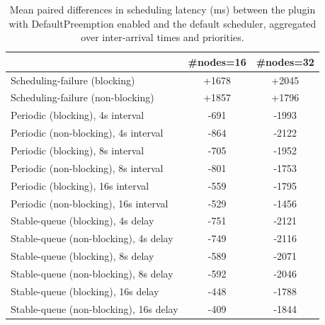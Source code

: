 \begin{table}[t]
\tiny
\setlength{\tabcolsep}{1.2pt}
\renewcommand{\arraystretch}{1.12}
\centering
\caption{Mean paired differences in scheduling latency (ms) between the plugin with DefaultPreemption enabled and the default scheduler, aggregated over inter-arrival times and priorities.}
\label{tab:latency-defpreempt1-std0-agg-arrival-prio}
\begin{tabular}{l c c}
\toprule
 & \#nodes=16 & \#nodes=32 \\
\midrule
Scheduling-failure (blocking) & +1678 & +2045 \\
Scheduling-failure (non-blocking) & +1857 & +1796 \\
Periodic (blocking), 4s interval & -691 & -1993 \\
Periodic (non-blocking), 4s interval & -864 & -2122 \\
Periodic (blocking), 8s interval & -705 & -1952 \\
Periodic (non-blocking), 8s interval & -801 & -1753 \\
Periodic (blocking), 16s interval & -559 & -1795 \\
Periodic (non-blocking), 16s interval & -529 & -1456 \\
Stable-queue (blocking), 4s delay & -751 & -2121 \\
Stable-queue (non-blocking), 4s delay & -749 & -2116 \\
Stable-queue (blocking), 8s delay & -589 & -2071 \\
Stable-queue (non-blocking), 8s delay & -592 & -2046 \\
Stable-queue (blocking), 16s delay & -448 & -1788 \\
Stable-queue (non-blocking), 16s delay & -409 & -1844 \\
\bottomrule
\end{tabular}
\end{table}
